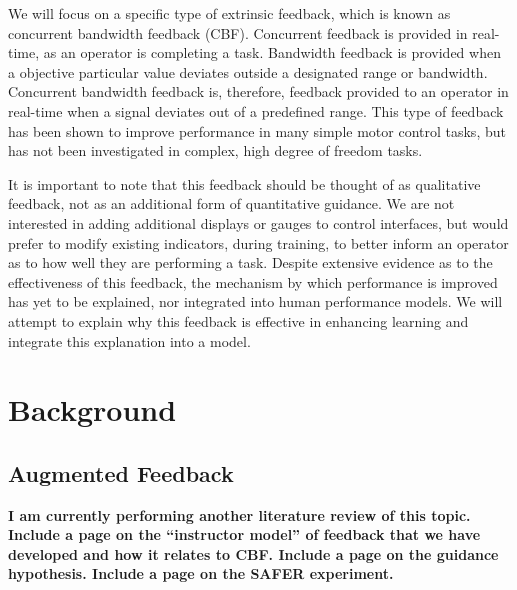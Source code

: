 We will focus on a specific type of extrinsic feedback, which is known as concurrent bandwidth feedback (CBF).
Concurrent feedback is provided in real-time, as an operator is completing a task.
Bandwidth feedback is provided when a objective particular value deviates outside a designated range or bandwidth.
Concurrent bandwidth feedback is, therefore, feedback provided to an operator in real-time when a signal deviates out of a predefined range.
This type of feedback has been shown to improve performance in many simple motor control tasks, but has not been investigated in complex, high degree of freedom tasks.

It is important to note that this feedback should be thought of as qualitative feedback, not as an additional form of quantitative guidance.
We are not interested in adding additional displays or gauges to control interfaces, but would prefer to modify existing indicators, during training, to better inform an operator as to how well they are performing a task.
Despite extensive evidence as to the effectiveness of this feedback, the mechanism by which performance is improved has yet to be explained, nor integrated into human performance models.
We will attempt to explain why this feedback is effective in enhancing learning and integrate this explanation into a model.

\section{Background}

\subsection{Augmented Feedback}
\textbf{\color{red} I am currently performing another literature review of this topic.
    Include a page on the ``instructor model'' of feedback that we have developed and how it relates to CBF.
    Include a page on the guidance hypothesis.
    Include a page on the SAFER experiment.}

